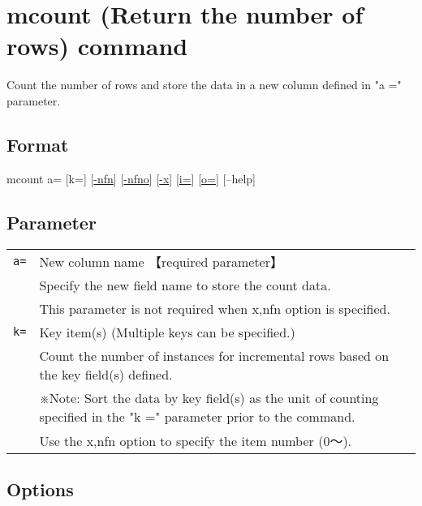 \documentclass[a4paper]{jarticle}
\begin{document}
\setlength{\baselineskip}{4mm}

\section*{mcount (Return the number of rows) command}
Count the number of rows and store the data in a new column defined in "a =" parameter.

\subsection*{Format}
mcount a= [k=] [\href{run:option.pdf}{-nfn}] [\href{run:option.pdf}{-nfno}]  [\href{run:option.pdf}{-x}]  [\href{run:option.pdf}{i=}] [\href{run:option.pdf}{o=}] [--help]\\

\subsection*{Parameter}
\begin{table}[htbp]
{\small
\begin{tabular}{ll}
\verb|a=|    & New column name  【required parameter】 \\
& Specify the new field name to store the count data.\\
& This parameter is not required when x,nfn option is specified.\\
\verb|k=|    & Key item(s) (Multiple keys can be specified.)\\
& Count the number of instances for incremental rows based on the key field(s) defined.  \\
& ※Note: Sort the data by key field(s) as the unit of counting specified in the "k =" parameter prior to the command. \\
& Use the x,nfn option to specify the item number (0〜).\\
\end{tabular} 
}
\end{table} 

\subsection*{Options}
\begin{table}[htbp]
{\small
\begin{tabular}{ll}
\end{tabular} 
}
\end{table} 
\end{document}
